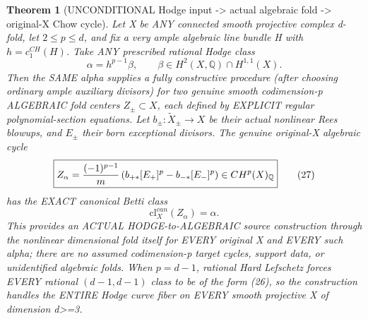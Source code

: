\documentclass[11pt]{article}
\newtheorem{theorem}{Theorem}[section]
\begin{document}
\begin{theorem}[UNCONDITIONAL Hodge input -> actual algebraic fold -> original-X Chow cycle]
Let X be ANY connected smooth projective
complex d-fold, let $2\le p\le d$, and
fix a very ample algebraic line bundle H with
$h=c_1^{CH}(H)$. Take ANY prescribed rational
Hodge class
\[
 \alpha=h^{p-1}\beta,\qquad
 \beta\in H^2(X,\mathbb Q)\cap H^{1,1}(X).
                                                               \tag{26}
\]
Then the SAME alpha supplies a fully constructive
procedure (after choosing ordinary ample auxiliary
divisors) for two genuine smooth codimension-p
ALGEBRAIC fold centers
$Z_\pm\subset X$, each defined by
EXPLICIT regular polynomial-section equations.
Let $b_\pm:\widetilde X_\pm\to X$ be their
actual nonlinear Rees blowups,
and $E_\pm$ their born exceptional divisors.
The genuine original-X algebraic cycle
\[
 \boxed{
 Z_\alpha=
 {(-1)^{p-1}\over m}
 \left(b_{+*}[E_+]^p-b_{-*}[E_-]^p\right)
 \in CH^p(X)_{\mathbb Q}
 }                                                       \tag{27}
\]
has the EXACT canonical Betti class
\[
 \boxed{
 \mathrm{cl}^{can}_X(Z_\alpha)=\alpha .
 }                                                       \tag{28}
\]
This provides an ACTUAL HODGE-to-ALGEBRAIC
source construction through the
nonlinear dimensional fold itself for
EVERY original X and EVERY such alpha;
there are no assumed codimension-p
target cycles, support data,
or unidentified algebraic folds.
When $p=d-1$, rational Hard Lefschetz
forces EVERY rational $(d-1,d-1)$
class to be of the form (26), so
the construction handles the
ENTIRE Hodge curve fiber on EVERY
smooth projective X of dimension d>=3.
\end{theorem}
\end{document}
